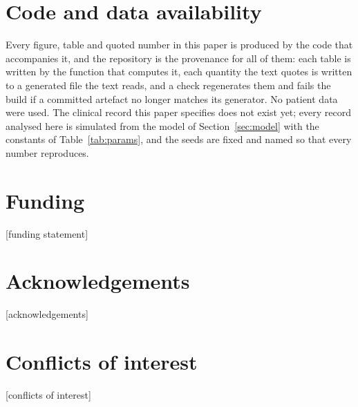 \clearpage

\section*{Code and data availability}
Every figure, table and quoted number in this paper is produced by the code that
accompanies it, and the repository is the provenance for all of them: each table
is written by the function that computes it, each quantity the text quotes is
written to a generated file the text reads, and a check regenerates them and
fails the build if a committed artefact no longer matches its generator. No
patient data were used. The clinical record this paper specifies does not exist
yet; every record analysed here is simulated from the model of
Section~\ref{sec:model} with the constants of Table~\ref{tab:params}, and the
seeds are fixed and named so that every number reproduces.

\section*{Funding}
[funding statement]

\section*{Acknowledgements}
[acknowledgements]

\section*{Conflicts of interest}
[conflicts of interest]

\clearpage
\printbibliography[title={References}]


